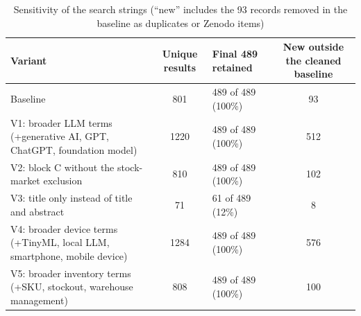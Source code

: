 \begin{table}[htbp]
\centering
\small
\caption{Sensitivity of the search strings (``new'' includes the 93 records removed in the baseline as duplicates or Zenodo items)}
\label{tab:J}
\begin{tabularx}{\textwidth}{Yclc}
\hline
\textbf{Variant} & \textbf{Unique results} & \textbf{Final 489 retained} & \textbf{New outside the cleaned baseline} \\ \hline
Baseline & 801 & 489 of 489 (100\%) & 93 \\
V1: broader LLM terms (+generative AI, GPT, ChatGPT, foundation model) & 1220 & 489 of 489 (100\%) & 512 \\
V2: block C without the stock-market exclusion & 810 & 489 of 489 (100\%) & 102 \\
V3: title only instead of title and abstract & 71 & 61 of 489 (12\%) & 8 \\
V4: broader device terms (+TinyML, local LLM, smartphone, mobile device) & 1284 & 489 of 489 (100\%) & 576 \\
V5: broader inventory terms (+SKU, stockout, warehouse management) & 808 & 489 of 489 (100\%) & 100 \\ \hline
\end{tabularx}
\par\vspace{2pt}{\normalsize Source: Authors' analysis of OpenAlex data.}
\end{table}
